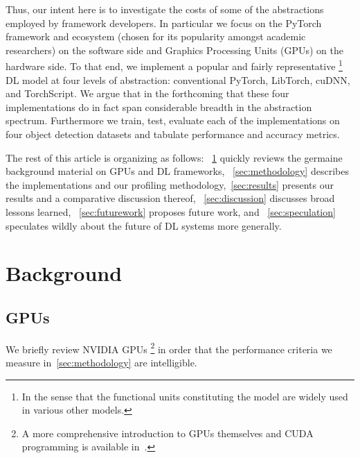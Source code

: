 \documentclass[sigconf]{acmart}
\begin{document}
Thus, our intent here is to investigate the costs of some of the abstractions employed by framework developers.
In particular we focus on the PyTorch framework and ecosystem (chosen for its popularity amongst academic researchers) on the software side and Graphics Processing Units (GPUs) on the hardware side.
To that end, we implement a popular and fairly representative%
\footnote{In the sense that the functional units constituting the model are widely used in various other models.}
DL model at four levels of abstraction: conventional PyTorch, LibTorch, cuDNN, and TorchScript.
We argue that in the forthcoming that these four implementations do in fact span considerable breadth in the abstraction spectrum.
Furthermore we train, test, evaluate each of the implementations on four object detection datasets and tabulate performance and accuracy metrics.

The rest of this article is organizing as follows: ~\cref{sec:background} quickly reviews the germaine background material on GPUs and DL frameworks, ~\cref{sec:methodology} describes the implementations and our profiling methodology,~\cref{sec:results} presents our results and a comparative discussion thereof, ~\cref{sec:discussion} discusses broad lessons learned, ~\cref{sec:futurework} proposes future work, and ~\cref{sec:speculation} speculates wildly about the future of DL systems more generally.


\section{Background}\label{sec:background}
\subsection{GPUs}\label{subsec:gpus}

We briefly review NVIDIA GPUs%
\footnote{A more comprehensive introduction to GPUs themselves and CUDA programming is available in~\cite{10.5555/2935593}.}
in order that the performance criteria we measure in~\cref{sec:methodology} are intelligible.
\end{document}
